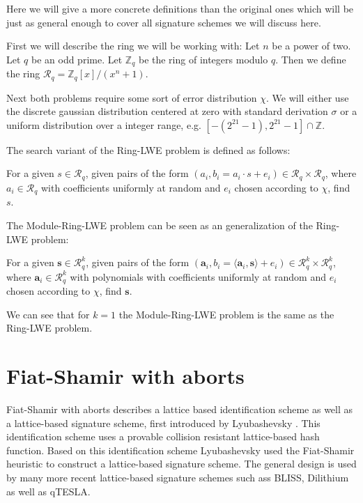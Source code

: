 Here we will give a more concrete definitions than the original ones \cite{rlwe,glwe} which will be just as general enough to cover all signature schemes we will discuss here.

First we will describe the ring we will be working with:
Let $n$ be a power of two. Let $q$ be an odd prime. Let $\mathds{Z}_q$ be the ring of integers modulo $q$. Then we define the ring $\mathcal{R}_q = \mathds{Z}_q[x]/(x^n+1)$.
 
 Next both problems require some sort of error distribution $\chi$. We will either use the discrete gaussian distribution centered at zero with standard derivation $σ$ or %
 a uniform distribution over a integer range, e.g. $[-(2^{21} - 1), 2^{21} - 1] \cap \mathds{Z}$.
 
 The search variant of the Ring-LWE problem is defined as follows:
 \begin{definition}
 For a given $s \in \mathcal{R}_q$, given pairs of the form $(a_i, b_i = a_i \cdot s + e_i) \in \mathcal{R}_q \times \mathcal{R}_q$, where $a_i \in \mathcal{R}_q$ with coefficients uniformly at random and $e_i$ chosen according to $\chi$, find $s$.
 \end{definition}
 
 The Module-Ring-LWE problem can be seen as an generalization of the Ring-LWE problem:
\begin{definition}
For a given $\bm{s} \in \mathcal{R}_q^k$, given pairs of the form $(\bm{a}_i, b_i = \langle \bm{a}_i, \bm{s} \rangle + e_i) \in \mathcal{R}_q^k \times \mathcal{R}_q^k$, where $\bm{a}_i \in \mathcal{R}_q^k$ with polynomials with coefficients uniformly at random and $e_i$ chosen according to $\chi$, find $\bm{s}$.
\end{definition}

We can see that for $k = 1$ the Module-Ring-LWE problem is the same as the Ring-LWE problem.

\section{Fiat-Shamir with aborts}
Fiat-Shamir with aborts describes a lattice based identification scheme as well as a lattice-based signature scheme, first introduced by Lyubashevsky \cite{fiatshamirabort}.   This identification scheme uses a provable collision resistant lattice-based hash function. Based on this identification scheme Lyubashevsky used the Fiat-Shamir heuristic \cite{fiatshamir} to construct a lattice-based signature scheme. The general design is used by many more recent lattice-based signature schemes such ass BLISS, Dilithium as well as qTESLA.


